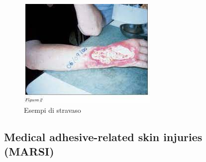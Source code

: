 \begin{figure}[H]
    \begin{center}
    \includegraphics[width=0.5\columnwidth]{img/stravaso2.jpeg}
    \end{center}
    \caption{Esempi di stravaso
    \cite{img57}}
    \label{fig:FIGURE_4.21}
\end{figure}

\subsection{Medical adhesive-related skin injuries (MARSI)}

